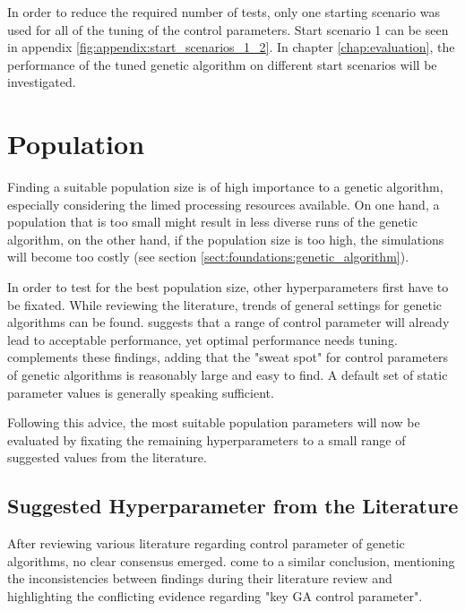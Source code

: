 In order to reduce the required number of tests, only one starting scenario was used for all of the tuning of the control parameters. Start scenario 1 can be seen in appendix \ref{fig:appendix:start_scenarios_1_2}. In chapter \ref{chap:evaluation}, the performance of the tuned genetic algorithm on different start scenarios will be investigated.

\section{Population}
\label{sect:hyperparameter_tuning:population}
Finding a suitable population size is of high importance to a genetic algorithm, especially considering the limed processing resources available. On one hand, a population that is too small might result in less diverse runs of the genetic algorithm, on the other hand, if the population size is too high, the simulations will become too costly (see section \ref{sect:foundations:genetic_algorithm}).

In order to test for the best population size, other hyperparameters first have to be fixated. While reviewing the literature, trends of general settings for genetic algorithms can be found. 
\cite{grefenstette_optimization_1986} suggests that a range of control parameter will already lead to acceptable performance, yet optimal performance needs tuning. \cite{kacprzyk_parameter_2007} complements these findings, adding that the "sweat spot" for control parameters of genetic algorithms is reasonably large and easy to find. A default set of static parameter values is generally speaking sufficient.

Following this advice, the most suitable population parameters will now be evaluated by fixating the remaining hyperparameters to a small range of suggested values from the literature.

\subsection{Suggested Hyperparameter from the Literature}
After reviewing various literature regarding control parameter of genetic algorithms, no clear consensus emerged. \cite{mills_determining_2015} come to a similar conclusion, mentioning the inconsistencies between findings during their literature review and highlighting the conflicting evidence regarding "key GA control parameter".

